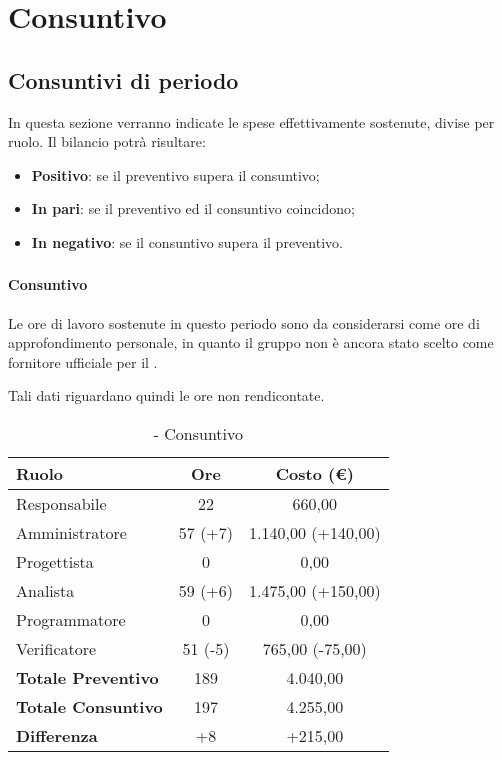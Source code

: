 \documentclass[./PianoDiProgetto.tex]{subfiles}
\begin{document}
\section{Consuntivo}
\subsection{Consuntivi di periodo}
In questa sezione verranno indicate le spese effettivamente sostenute, divise per ruolo. Il bilancio potrà risultare:
\begin{itemize}
  \item \textbf{Positivo}: se il preventivo supera il consuntivo;
  \item \textbf{In pari}: se il preventivo ed il consuntivo coincidono;
  \item \textbf{In negativo}: se il consuntivo supera il preventivo.
\end{itemize}
\subsubsection{\PerAR}
	\paragraph{Consuntivo}
Le ore di lavoro sostenute in questo periodo sono da considerarsi come ore di approfondimento personale, in quanto il gruppo \GRUPPO{} non è ancora stato scelto come fornitore ufficiale per il  \PROGETTO.

		Tali dati riguardano quindi le ore non rendicontate.

\begin{table}[h]
		\centering
		\begin{tabular}{l * {2}{c}}
			\toprule
			\textbf{Ruolo} & \textbf{Ore} & \textbf{Costo (\euro{})} \\
			\midrule
			Responsabile &	22 & 660,00 \\
			Amministratore & 57 (+7) & 1.140,00 (+140,00)\\
			Progettista & 0 & 0,00 \\
			Analista & 59 (+6) & 1.475,00 (+150,00)\\
			Programmatore & 0 & 0,00 \\
			Verificatore & 51 (-5) & 765,00 (-75,00)\\
			\midrule
			\textbf{Totale Preventivo} & 189
 & 4.040,00
 \\
			\textbf{Totale Consuntivo} & 197 & 4.255,00
 \\
			\midrule
			\textbf{Differenza} & +8 & +215,00 \\
			\bottomrule
		\end{tabular}
		\caption{\PerAR{} - Consuntivo}
		\label{tab:consuntivoA}

	\end{table}
\end{document}
